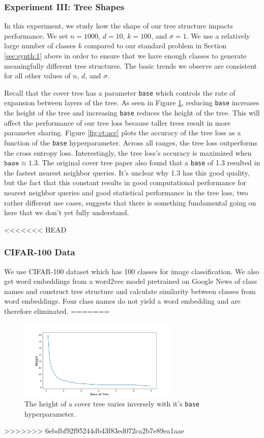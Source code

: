 \documentclass[twoside]{article}
\begin{document}
\subsubsection{Experiment III: Tree Shapes}

In this experiment, we study how the shape of our tree structure impacts performance.
We set $n=1000$, $d=10$, $k=100$, and $\sigma=1$.
We use a relatively large number of classes $k$ compared to our standard problem in Section \ref{sec:synth:1} above in order to ensure that we have enough classes to generate meaningfully different tree structures.
The basic trends we observe are consistent for all other values of $n$, $d$, and $\sigma$.

Recall that the cover tree has a parameter \texttt{base} which controls the rate of expansion between layers of the tree.
As seen in Figure \ref{fig:ct:height}, reducing \texttt{base} increases the height of the tree and increasing \texttt{base} reduces the height of the tree.
This will affect the performance of our tree loss because taller trees result in more parameter sharing.
Figure \ref{fig:ct:acc} plots the accuracy of the tree loss as a function of the \texttt{base} hyperparameter.
Across all ranges, the tree loss outperforms the cross entropy loss.
Interestingly, the tree loss's accuracy is maximized when $\texttt{base}\approx1.3$.
The original cover tree paper \citep{beygelzimer2006cover} also found that a \texttt{base} of 1.3 resulted in the fastest nearest neighbor queries.
It's unclear why 1.3 has this good quality,
but the fact that this constant results in good computational performance for nearest neighbor queries and good statistical performance in the tree loss, two rather different use cases, suggests that there is something fundamental going on here that we don't yet fully understand.

<<<<<<< HEAD
\subsubsection{CIFAR-100 Data}
We use CIFAR-100 dataset \cite{Krizhevsky2009LearningML} which has 100 classes for image classification.
We also get word embeddings from a word2vec model pretrained on Google News \cite{Mikolov2013EfficientEO} of class names and construct tree structure and calculate similarity between classes from word embeddings.
Four class names do not yield a word embedding and are therefore eliminated.
=======
\begin{figure}
            \includegraphics[width=\columnwidth,height=1.5in]{fig/new_img/height_vs_base.png}
            \caption{The height of a cover tree varies inversely with it's \texttt{base} hyperparameter.}
            \label{fig:ct:height}
\end{figure}
>>>>>>> 6ebdbf92f95244db43f83ed072ca2b7e89ea1aae
\end{document}
